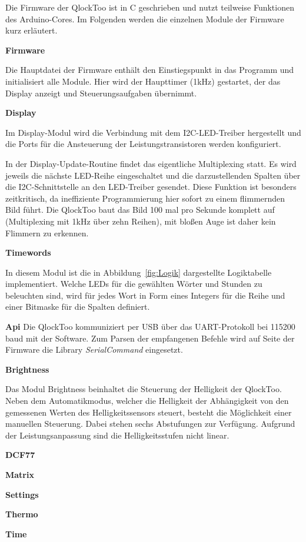 \begin{multicols}{2}
Die Firmware der QlockToo ist in C geschrieben und nutzt teilweise Funktionen des Arduino-Cores.
Im Folgenden werden die einzelnen Module der Firmware kurz erläutert.

\textbf{Firmware}

Die Hauptdatei der Firmware enthält den Einstiegspunkt in das Programm und initialisiert alle Module. Hier wird der Haupttimer (1kHz) gestartet, der das Display anzeigt und Steuerungsaufgaben übernimmt.

\textbf{Display}

Im Display-Modul wird die Verbindung mit dem I2C-LED-Treiber hergestellt und die Ports für die Ansteuerung der Leistungstransistoren werden konfiguriert.

In der Display-Update-Routine findet das eigentliche Multiplexing statt. Es wird jeweils die nächste LED-Reihe eingeschaltet und die darzustellenden Spalten über die I2C-Schnittstelle an den LED-Treiber gesendet.
Diese Funktion ist besonders zeitkritisch, da ineffiziente Programmierung hier sofort zu einem flimmernden Bild führt.
Die QlockToo baut das Bild 100 mal pro Sekunde komplett auf (Multiplexing mit 1kHz über zehn Reihen), mit bloßen Auge ist daher kein Flimmern zu erkennen.

\textbf{Timewords}

In diesem Modul ist die in Abbildung~\ref{fig:Logik} dargestellte Logiktabelle implementiert.
Welche LEDs für die gewählten Wörter und Stunden zu beleuchten sind, wird für jedes Wort in Form eines Integers für die Reihe und einer Bitmaske für die Spalten definiert.

\textbf{Api}
Die QlockToo kommuniziert per USB über das UART-Protokoll bei 115200 baud mit der Software.
Zum Parsen der empfangenen Befehle wird auf Seite der Firmware die Library \emph{SerialCommand} eingesetzt.

\textbf{Brightness}

Das Modul Brightness beinhaltet die Steuerung der Helligkeit der QlockToo. Neben dem Automatikmodus, welcher die Helligkeit der  Abhängigkeit von den gemessenen Werten des Helligkeitssensors steuert, besteht die Möglichkeit einer manuellen Steuerung. Dabei stehen sechs Abstufungen zur Verfügung. Aufgrund der Leistungsanpassung sind die Helligkeitsstufen nicht linear.

\textbf{DCF77}

\textbf{Matrix}

\textbf{Settings}

\textbf{Thermo}

\textbf{Time}

\end{multicols}
